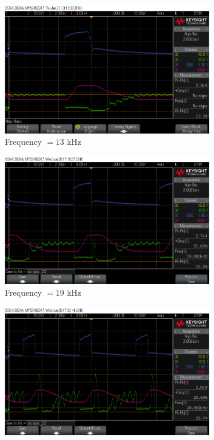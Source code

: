 \documentclass[11pt]{article}
\begin{document}
\begin{figure}[h!]
\centering
\begin{subfigure}{0.49\textwidth}
\centering
\includegraphics[width = \textwidth]{craft_sc_31}
\caption{Frequency $= 13$ kHz}
\label{fig:craft_sc_31}
\end{subfigure}
\begin{subfigure}{0.49\textwidth}
\centering
\includegraphics[width = \textwidth]{craft_sc_32}
\caption{Frequency $= 19$ kHz}
\label{fig:craft_sc_32}
\end{subfigure}
\begin{subfigure}{0.49\textwidth}
\centering
\includegraphics[width = \textwidth]{craft_sc_33}

\end{subfigure}
\end{figure}
\end{document}
